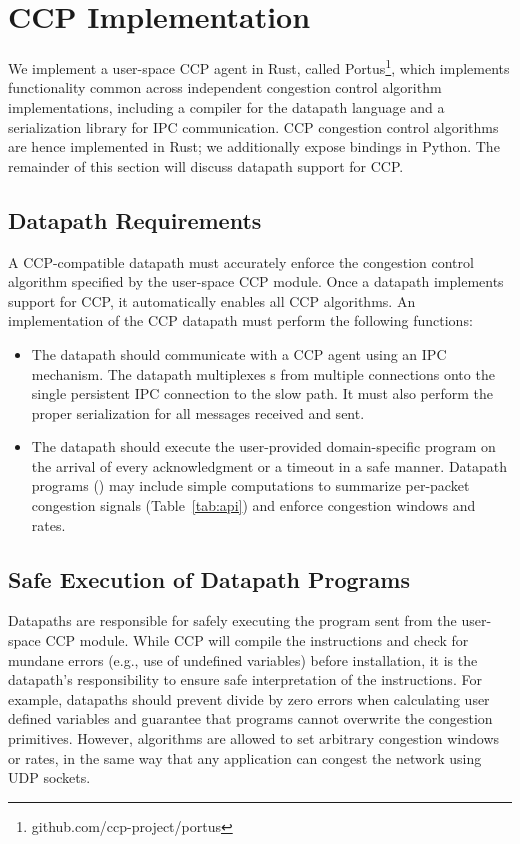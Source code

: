 \section{CCP Implementation}
\label{s:datapath}

We implement a user-space CCP agent in Rust, called Portus\footnote{github.com/ccp-project/portus}, which implements functionality common across independent congestion control algorithm implementations, including a compiler for the datapath language and a serialization library for IPC communication.
CCP congestion control algorithms are hence implemented in Rust; we additionally expose bindings in Python. The remainder of this section will discuss datapath support for CCP.

\subsection{Datapath Requirements}
\label{sec:implementation-basics}
A CCP-compatible datapath must accurately enforce the congestion
control algorithm specified by the user-space CCP module.
Once a datapath implements
support for CCP, it automatically enables all CCP algorithms.
An implementation of the CCP datapath must perform the following functions:
\begin{itemize}
\item The datapath should communicate with a \userspace CCP agent using an IPC
  mechanism. The datapath multiplexes s from multiple connections
  onto the single persistent IPC connection to the slow path. It must also perform
  the proper serialization for all messages received and sent.
\item The datapath should execute the user-provided domain-specific program on
  the arrival of every acknowledgment or a timeout in a safe manner. Datapath
  programs () may include simple computations to summarize
  per-packet congestion signals (Table~\ref{tab:api}) and enforce congestion
  windows and rates.
\end{itemize}

\subsection{Safe Execution of Datapath Programs}
\label{s:datapath:fold}
Datapaths are responsible for safely executing the program sent from the user-space CCP module. While CCP will compile the instructions and check for mundane errors (e.g., use of undefined variables) before installation, it is the datapath’s responsibility to ensure safe interpretation of the instructions. For example, datapaths should prevent divide by zero errors when calculating user defined variables and guarantee that programs cannot overwrite the congestion primitives. However, algorithms are allowed to set arbitrary congestion windows or rates, in the same way that any application can congest the network using UDP sockets.

